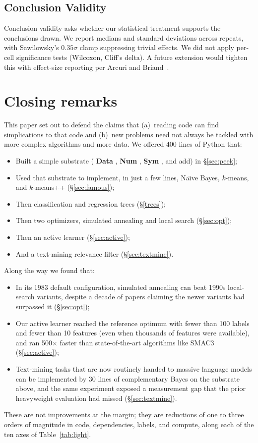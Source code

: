 \documentclass[AMA,STIX2COL]{WileyNJDv5}
\newcommand{\cls}[1]{%
  \setlength{\fboxsep}{1.5pt}%
  \colorbox{clsbg}{\sffamily\bfseries{#1}}%
}
\begin{document}
{\subsection{Conclusion Validity}
Conclusion validity asks whether our statistical treatment
supports the conclusions drawn. We report medians and
standard deviations across repeats, with Sawilowsky's
$0.35\sigma$ clamp suppressing trivial effects. We did not
apply per-cell significance tests (Wilcoxon, Cliff's delta).
A future extension would tighten this with effect-size
reporting per Arcuri and
Briand~\cite{arcuri2011practical}.

\section{Closing remarks}\label{sec:disc}

This paper set out to defend the claims 
that (a)~reading code can find simplications
to that code and (b)~new problems need not always be
tackled with more complex algorithms and more data. We offered
400 lines of Python that:
\begin{itemize}
\item Built a simple substrate (\cls{Data}, \cls{Num},
\cls{Sym}, and \textsf{add}) in \S\ref{sec:peek};
\item Used that substrate to implement, in just a few lines,
Na\"{\i}ve Bayes, $k$-means, and $k$-means++ (\S\ref{sec:famous});
\item Then classification and regression trees
(\S\ref{trees});
\item Then two optimizers, simulated annealing and local
search (\S\ref{sec:opt});
\item Then an active learner (\S\ref{sec:active});
\item And a text-mining relevance filter
(\S\ref{sec:textmine}).
\end{itemize}

Along the way we found that:
\begin{itemize}
\item In its 1983 default configuration, simulated annealing
can beat 1990s local-search variants, despite a decade of
papers claiming the newer variants had surpassed it
(\S\ref{sec:opt});
\item Our active learner reached the reference optimum with
fewer than 100 labels and fewer than 10 features (even when
thousands of features were available), and ran 500$\times$
faster than state-of-the-art algorithms like SMAC3
(\S\ref{sec:active});
\item Text-mining tasks that are now routinely handed to
massive language models can be implemented by 30 lines of
complementary Bayes on the substrate above, and the same
experiment exposed a measurement gap that the prior
heavyweight evaluation had missed (\S\ref{sec:textmine}).
\end{itemize}
These are not improvements at the margin; they are reductions
of one to three orders of magnitude in code, dependencies,
labels, and compute, along each of the ten axes of
Table~\ref{tab:light}.

}
\end{document}

